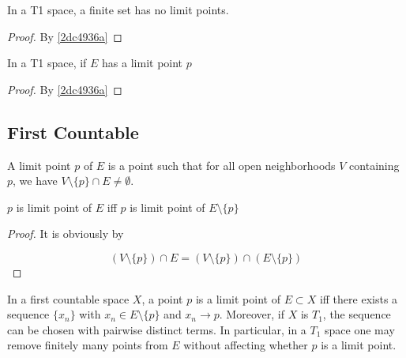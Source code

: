 \begin{corollary}
    In a T1 space, a finite set has no limit points. 
\end{corollary}

\begin{proof}
    By \cref{2dc4936a}
\end{proof}

\begin{corollary}
    In a T1 space, if $E$ has a limit point $p$
\end{corollary}

\begin{proof}
    By \cref{2dc4936a}
\end{proof}

\subsection{First Countable}

\begin{definition}
   A limit point $p$ of $E$ is a point such that for all open neighborhoods 
   $V$ containing $p$, we have $V \setminus \{ p \} \cap E \ne \emptyset$.
\end{definition}


\begin{corollary}\label{57d9c0d2}
    $p$ is limit point of $E$ iff $p$ is  limit point of $E \setminus \{ p \}$
\end{corollary}

\begin{proof}
    It is obviously by 

    \[
        \left(V \setminus \{ p \} \right) \cap E = \left(V \setminus \{ p \} \right) \cap \left( E \setminus \{ p \} \right)
    \]
\end{proof}

\begin{thm}\label{4ebc8233}
    In a first countable space $X$, a point $p$ is a limit point of $E\subset X$ iff 
    there exists a sequence $\{ x_n \}$ with $x_n\in E\setminus\{p\}$ and $x_n\to p$. Moreover, if $X$ is $T_1$, the sequence can be chosen with pairwise distinct terms. In particular, in a $T_1$ space one may remove finitely many points from $E$ without affecting whether $p$ is a limit point.
\end{thm}

